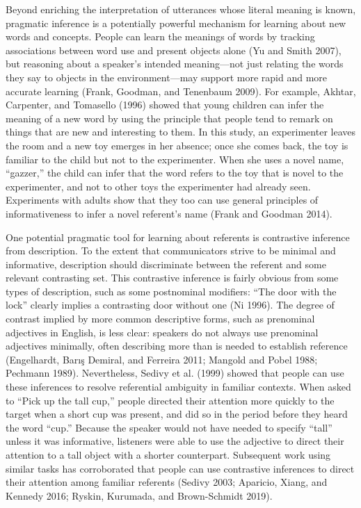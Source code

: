 \documentclass{ucetd}
\begin{document}
Beyond enriching the interpretation of utterances whose literal meaning
is known, pragmatic inference is a potentially powerful mechanism for
learning about new words and concepts. People can learn the meanings of
words by tracking associations between word use and present objects
alone (Yu and Smith 2007), but reasoning about a speaker's intended
meaning---not just relating the words they say to objects in the
environment---may support more rapid and more accurate learning (Frank,
Goodman, and Tenenbaum 2009). For example, Akhtar, Carpenter, and
Tomasello (1996) showed that young children can infer the meaning of a
new word by using the principle that people tend to remark on things
that are new and interesting to them. In this study, an experimenter
leaves the room and a new toy emerges in her absence; once she comes
back, the toy is familiar to the child but not to the experimenter. When
she uses a novel name, ``gazzer,'' the child can infer that the word
refers to the toy that is novel to the experimenter, and not to other
toys the experimenter had already seen. Experiments with adults show
that they too can use general principles of informativeness to infer a
novel referent's name (Frank and Goodman 2014).

One potential pragmatic tool for learning about referents is contrastive
inference from description. To the extent that communicators strive to
be minimal and informative, description should discriminate between the
referent and some relevant contrasting set. This contrastive inference
is fairly obvious from some types of description, such as some
postnominal modifiers: ``The door with the lock'' clearly implies a
contrasting door without one (Ni 1996). The degree of contrast implied
by more common descriptive forms, such as prenominal adjectives in
English, is less clear: speakers do not always use prenominal adjectives
minimally, often describing more than is needed to establish reference
(Engelhardt, Barış Demiral, and Ferreira 2011; Mangold and Pobel 1988;
Pechmann 1989). Nevertheless, Sedivy et al. (1999) showed that people
can use these inferences to resolve referential ambiguity in familiar
contexts. When asked to ``Pick up the tall cup,'' people directed their
attention more quickly to the target when a short cup was present, and
did so in the period before they heard the word ``cup.'' Because the
speaker would not have needed to specify ``tall'' unless it was
informative, listeners were able to use the adjective to direct their
attention to a tall object with a shorter counterpart. Subsequent work
using similar tasks has corroborated that people can use contrastive
inferences to direct their attention among familiar referents (Sedivy
2003; Aparicio, Xiang, and Kennedy 2016; Ryskin, Kurumada, and
Brown-Schmidt 2019).
\end{document}
